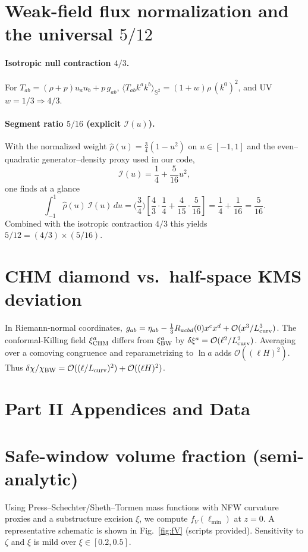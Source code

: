 \documentclass[aps,prd,onecolumn,superscriptaddress,nofootinbib]{revtex4-2}
\begin{document}
\section{Weak-field flux normalization and the universal \texorpdfstring{$5/12$}{5/12}}
\label{app:five-twelve}
\paragraph{Isotropic null contraction \(4/3\).} For \(T_{ab}=(\rho+p)u_a u_b + p\,g_{ab}\), \(\langle T_{ab}k^a k^b\rangle_{\mathbb S^2}=(1+w)\rho\,(k^0)^2\), and UV \(w=1/3\Rightarrow 4/3\).

\paragraph{Segment ratio \(5/16\) (explicit \(\mathcal I(u)\)).}
With the normalized weight \(\hat\rho(u)=\tfrac{3}{4}(1-u^2)\) on \(u\in[-1,1]\) and the even–quadratic generator–density proxy used in our code,
\[
\mathcal I(u)=\frac{1}{4}+\frac{5}{16}u^2,
\]
one finds at a glance
\[
\int_{-1}^{1}\! \hat\rho(u)\,\mathcal I(u)\,du
=\Big(\frac{3}{4}\Big)\!\left[\frac{4}{3}\cdot\frac{1}{4}+\frac{4}{15}\cdot\frac{5}{16}\right]
=\frac{1}{4}+\frac{1}{16}
=\frac{5}{16}.
\]
Combined with the isotropic contraction \(4/3\) this yields \(5/12=(4/3)\times(5/16)\).

\section{CHM diamond vs.\ half-space KMS deviation}
\label{app:chm-kms-estimate}
In Riemann-normal coordinates,
\(g_{ab}=\eta_{ab}-\tfrac{1}{3}R_{acbd}(0)x^c x^d+\mathcal O(x^3/L_{\rm curv}^3)\).
The conformal-Killing field \(\xi^a_{\rm CHM}\) differs from \(\xi^a_{\rm BW}\) by \(\delta\xi^a=\mathcal O(\ell^2/L_{\rm curv}^2)\).
Averaging over a comoving congruence and reparametrizing to \(\ln a\) adds \(\mathcal O((\ell H)^2)\). Thus
\(\delta\chi/\chi_{\rm BW}=\mathcal O((\ell/L_{\rm curv})^2)+\mathcal O((\ell H)^2)\).

\section*{Part II Appendices and Data}

\section{Safe-window volume fraction (semi-analytic)}
\label{app:fv}
Using Press–Schechter/Sheth–Tormen mass functions with NFW curvature proxies and a substructure excision \(\xi\), we compute \(f_V(\ell_{\min})\) at \(z\!=\!0\). A representative schematic is shown in Fig.~\ref{fig:fV} (scripts provided). Sensitivity to \(\zeta\) and \(\xi\) is mild over \(\xi\in[0.2,0.5]\).
\end{document}
